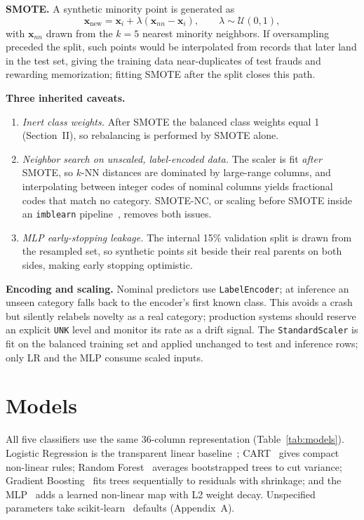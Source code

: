 \documentclass[conference]{IEEEtran}
\begin{document}
\textbf{SMOTE.} A synthetic minority point is generated as
\begin{equation}
\mathbf{x}_{\text{new}}=\mathbf{x}_i+\lambda(\mathbf{x}_{nn}-\mathbf{x}_i),\qquad\lambda\sim\mathcal{U}(0,1),
\end{equation}
with $\mathbf{x}_{nn}$ drawn from the $k=5$ nearest minority neighbors. If oversampling preceded the split, such points would be interpolated from records that later land in the test set, giving the training data near-duplicates of test frauds and rewarding memorization; fitting SMOTE after the split closes this path.

\textbf{Three inherited caveats.}
\begin{enumerate}
\item \emph{Inert class weights.} After SMOTE the balanced class weights equal 1 (Section~II), so rebalancing is performed by SMOTE alone.
\item \emph{Neighbor search on unscaled, label-encoded data.} The scaler is fit \emph{after} SMOTE, so $k$-NN distances are dominated by large-range columns, and interpolating between integer codes of nominal columns yields fractional codes that match no category. SMOTE-NC, or scaling before SMOTE inside an \texttt{imblearn} pipeline~\cite{lemaitre17}, removes both issues.
\item \emph{MLP early-stopping leakage.} The internal 15\% validation split is drawn from the resampled set, so synthetic points sit beside their real parents on both sides, making early stopping optimistic.
\end{enumerate}

\textbf{Encoding and scaling.} Nominal predictors use \texttt{LabelEncoder}; at inference an unseen category falls back to the encoder's first known class. This avoids a crash but silently relabels novelty as a real category; production systems should reserve an explicit \texttt{UNK} level and monitor its rate as a drift signal. The \texttt{StandardScaler} is fit on the balanced training set and applied unchanged to test and inference rows; only LR and the MLP consume scaled inputs.

\section{Models}
All five classifiers use the same 36-column representation (Table~\ref{tab:models}). Logistic Regression is the transparent linear baseline~\cite{hosmer13}; CART~\cite{breiman84} gives compact non-linear rules; Random Forest~\cite{breiman01} averages bootstrapped trees to cut variance; Gradient Boosting~\cite{friedman01,friedman02} fits trees sequentially to residuals with shrinkage; and the MLP~\cite{rumelhart86} adds a learned non-linear map with L2 weight decay. Unspecified parameters take scikit-learn~\cite{pedregosa11} defaults (Appendix~A).
\end{document}
